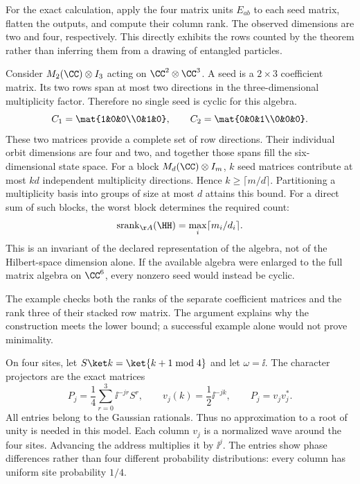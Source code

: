 For the exact calculation, apply the four matrix units $E_{ab}$ to each seed matrix, flatten the outputs, and compute their column rank. The observed dimensions are two and four, respectively. This directly exhibits the rows counted by the theorem rather than inferring them from a drawing of entangled particles.

Consider $M_2(\CC)\otimes I_3$ acting on $\CC^2\otimes\CC^3$. A seed is a $2\times3$ coefficient matrix. Its two rows span at most two directions in the three-dimensional multiplicity factor. Therefore no single seed is cyclic for this algebra.
\[
C_1=\mat{1&0&0\\0&1&0},\qquad
C_2=\mat{0&0&1\\0&0&0}.
\]
These two matrices provide a complete set of row directions. Their individual orbit dimensions are four and two, and together those spans fill the six-dimensional state space.
For a block $M_d(\CC)\otimes I_m$, $k$ seed matrices contribute at most $kd$ independent multiplicity directions. Hence $k\ge\lceil m/d\rceil$. Partitioning a multiplicity basis into groups of size at most $d$ attains this bound. For a direct sum of such blocks, the worst block determines the required count:
\[
\operatorname{srank}_{\AA}(\HH)=\max_i\lceil m_i/d_i\rceil.
\]
This is an invariant of the declared representation of the algebra, not of the Hilbert-space dimension alone. If the available algebra were enlarged to the full matrix algebra on $\CC^6$, every nonzero seed would instead be cyclic.

The example checks both the ranks of the separate coefficient matrices and the rank three of their stacked row matrix. The argument explains why the construction meets the lower bound; a successful example alone would not prove minimality.

On four sites, let $S\ket k=\ket{k+1\bmod4}$ and let $\omega=\ii$. The character projectors are the exact matrices
\[
P_j=\frac14\sum_{r=0}^3\ii^{-jr}S^r,
\qquad v_j(k)=\frac12\ii^{-jk},\qquad P_j=v_jv_j^*.
\]
All entries belong to the Gaussian rationals. Thus no approximation to a root of unity is needed in this model.
Each column $v_j$ is a normalized wave around the four sites. Advancing the address multiplies it by $\ii^j$. The entries show phase differences rather than four different probability distributions: every column has uniform site probability $1/4$.

